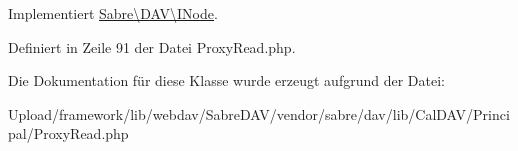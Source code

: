 Implementiert \mbox{\hyperlink{interface_sabre_1_1_d_a_v_1_1_i_node_ac90fa5526e98def2e1f51bc57a772366}{Sabre\textbackslash{}\+D\+A\+V\textbackslash{}\+I\+Node}}.



Definiert in Zeile 91 der Datei Proxy\+Read.\+php.



Die Dokumentation für diese Klasse wurde erzeugt aufgrund der Datei\+:\begin{DoxyCompactItemize}
\item 
Upload/framework/lib/webdav/\+Sabre\+D\+A\+V/vendor/sabre/dav/lib/\+Cal\+D\+A\+V/\+Principal/Proxy\+Read.\+php\end{DoxyCompactItemize}
